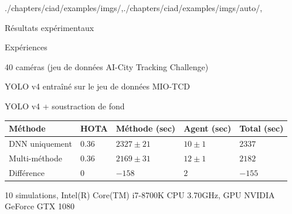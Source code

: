 \begin{graphicspathcontext}{{./chapters/ciad/examples/imgs/},{./chapters/ciad/examples/imgs/auto/},\old}

\begin{frame}{Résultats expérimentaux}
	\begin{block}{Expériences}
		\begin{description}
			\item 40 caméras (jeu de données AI-City Tracking Challenge)
			\item[Mono-méthode] YOLO v4 entraîné sur le jeu de données MIO-TCD
			\item[Multi-méthode] YOLO v4 + soustraction de fond
		\end{description}
	\end{block}
	\vspace{.5cm}
	\begin{tabularx}{\linewidth}{X|X|X|X|X}
		\hline
		\textbf{Méthode} & \textbf{HOTA} & \textbf{Méthode (sec)} & \textbf{Agent (sec)} & \textbf{Total (sec)} \\
		\hline\hline
		DNN uniquement & $0.36$ & $2327 \pm 21$ & $10 \pm 1$ & $2337$ \\
		\hline
		Multi-méthode & $0.36$ & $2169 \pm 31$ & $12 \pm 1$ & $2182$ \\
		\hline\hline
		Différence & $0$ & $-158$ & $2$ & $-155$ \\
		\hline
	\end{tabularx}
	\begin{center}
		{\small 10 simulations, Intel(R) Core(TM) i7-8700K CPU 3.70GHz, GPU NVIDIA GeForce GTX 1080}
	\end{center}
\end{frame}

\end{graphicspathcontext}

\endinput
